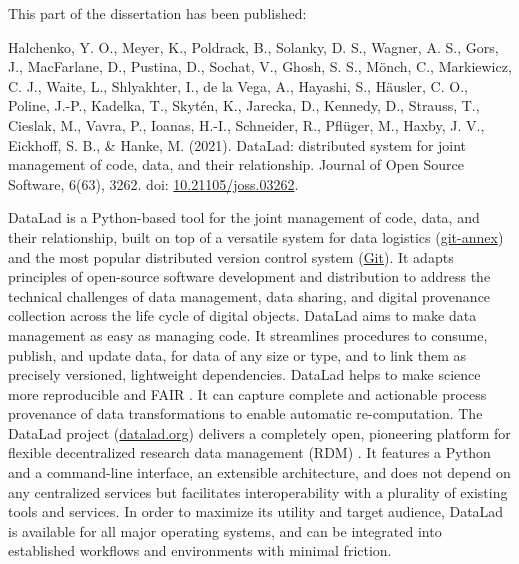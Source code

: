 This part of the dissertation has been published:

\bigbreak

\noindent
%
Halchenko, Y. O.,
Meyer, K.,
Poldrack, B.,
Solanky, D. S.,
Wagner, A. S.,
Gors, J.,
MacFarlane, D.,
Pustina, D.,
Sochat, V.,
Ghosh, S. S.,
Mönch, C.,
Markiewicz, C. J.,
Waite, L.,
Shlyakhter, I.,
de la Vega, A.,
Hayashi, S.,
Häusler, C. O.,
Poline, J.-P.,
Kadelka, T.,
Skytén, K.,
Jarecka, D.,
Kennedy, D.,
Strauss, T.,
Cieslak, M.,
Vavra, P.,
Ioanas, H.-I.,
Schneider, R.,
Pflüger, M.,
Haxby, J. V.,
Eickhoff, S. B.,
\& Hanke, M.
%
(2021).
%
DataLad: distributed system for joint management of code, data, and their
relationship.
%
Journal of Open Source Software, 6(63), 3262.
%
doi: \href{https://doi.org/10.21105/joss.03262}{\url{10.21105/joss.03262}}.


\begin{chapterabstract}
%
DataLad is a Python-based tool for the joint management of code, data, and
their relationship, built on top of a versatile system for data logistics
(\href{https://git-annex.branchable.com}{\url{git-annex}}) and the most popular
distributed version control system (\href{https://git-scm.com}{\url{Git}}).
%
It adapts principles of open-source software development and distribution to
address the technical challenges of data management, data sharing, and digital
provenance collection across the life cycle of digital objects.
%
DataLad aims to make data management as easy as managing code. It streamlines
procedures to consume, publish, and update data, for data of any size or type,
and to link them as precisely versioned, lightweight dependencies.
%
DataLad helps to make science more reproducible and FAIR
\citep{wilkinson2016fair}.
%
It can capture complete and actionable process provenance of data
transformations to enable automatic re-computation.
%
The DataLad project (\href{http://datalad.org}{\url{datalad.org}}) delivers a
completely open, pioneering platform for flexible decentralized research data
management (RDM) \citep{hanke2021defense}.
%
It features a Python and a command-line interface, an extensible architecture,
and does not depend on any centralized services but facilitates
interoperability with a plurality of existing tools and services.
%
In order to maximize its utility and target audience, DataLad is available for
all major operating systems, and can be integrated into established workflows
and environments with minimal friction.
%
\end{chapterabstract}
